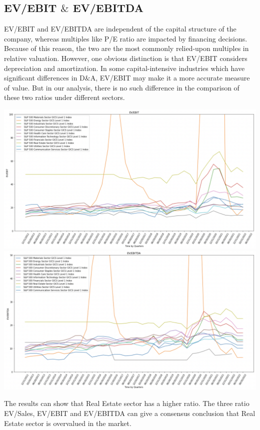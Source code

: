 \documentclass{article}
\begin{document}
\subsection{EV/EBIT $\&$ EV/EBITDA}
EV/EBIT and EV/EBITDA are independent of the capital structure of the company, whereas multiples like P/E ratio are impacted by financing decisions. Because of this reason, the two are the most commonly relied-upon multiples in relative valuation. However, one obvious distinction is that EV/EBIT considers depreciation and amortization. In some capital-intensive industries which have significant differences in D$\&$A, EV/EBIT may make it a more accurate measure of value. But in our analysis, there is no such difference in the comparison of these two ratios under different sectors.
\begin{center}
    \includegraphics[scale=0.4]{EV2EBIT.png}
    \includegraphics[scale=0.4]{EV2EBITDA.png}
\end{center}
The results can show that Real Estate sector has a higher ratio. The three ratio EV/Sales, EV/EBIT and EV/EBITDA can give a consensus conclusion that Real Estate sector is overvalued in the market.
\end{document}
